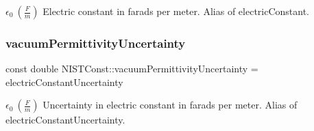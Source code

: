 $\epsilon_0 \ (\frac{F}{m})$ Electric constant in farads per meter. Alias of electric\+Constant. \mbox{\label{group___electric_constant_gac4df73e5c5ea0e0829f575ff1c2cc793}} 
\subsubsection{\texorpdfstring{vacuum\+Permittivity\+Uncertainty}{vacuumPermittivityUncertainty}}
{\footnotesize\ttfamily const double N\+I\+S\+T\+Const\+::vacuum\+Permittivity\+Uncertainty = electric\+Constant\+Uncertainty}

$\epsilon_0 \ (\frac{F}{m})$ Uncertainty in electric constant in farads per meter. Alias of electric\+Constant\+Uncertainty. 